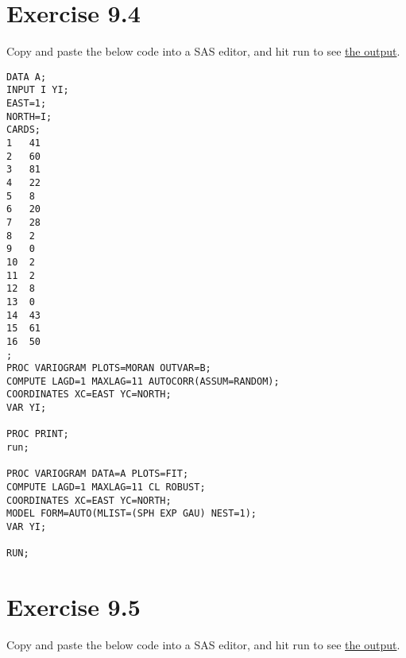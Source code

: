 \documentclass[]{book}
\begin{document}
\hypertarget{exercise-9.4}{%
\section{Exercise 9.4}\label{exercise-9.4}}

Copy and paste the below code into a SAS editor, and hit run to see \href{https://github.com/luckymehra/epidem-exercises/blob/master/sas_output/ex9_4.pdf}{the output}.

\begin{verbatim}
DATA A;
INPUT I YI;
EAST=1;
NORTH=I;
CARDS;
1   41
2   60
3   81
4   22
5   8
6   20
7   28
8   2
9   0
10  2
11  2
12  8
13  0
14  43
15  61
16  50
;
PROC VARIOGRAM PLOTS=MORAN OUTVAR=B;
COMPUTE LAGD=1 MAXLAG=11 AUTOCORR(ASSUM=RANDOM);
COORDINATES XC=EAST YC=NORTH;
VAR YI;

PROC PRINT;
run;

PROC VARIOGRAM DATA=A PLOTS=FIT;
COMPUTE LAGD=1 MAXLAG=11 CL ROBUST;
COORDINATES XC=EAST YC=NORTH;
MODEL FORM=AUTO(MLIST=(SPH EXP GAU) NEST=1);
VAR YI;

RUN;
\end{verbatim}

\hypertarget{exercise-9.5}{%
\section{Exercise 9.5}\label{exercise-9.5}}

Copy and paste the below code into a SAS editor, and hit run to see \href{https://github.com/luckymehra/epidem-exercises/blob/master/sas_output/ex9_5.pdf}{the output}.
\end{document}
